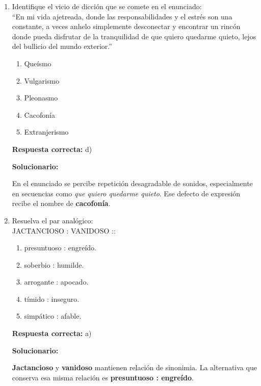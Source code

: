 \begin{enumerate}[resume]
	\vspace{2mm}
	\textbf{Solucionario:}
	
	En el contexto de la oración, \textbf{germen} significa inicio, principio o \textbf{origen}. Por ello, la respuesta correcta es \textbf{origen}.
	
	\vspace{6mm}
	
	\item Identifique el vicio de dicción que se comete en el enunciado:\\
	``En mi vida ajetreada, donde las responsabilidades y el estrés son una constante, a veces anhelo simplemente desconectar y encontrar un rincón donde pueda disfrutar de la tranquilidad de que quiero quedarme quieto, lejos del bullicio del mundo exterior.''
	\begin{enumerate}[label=\alph*)]
		\item Queísmo
		\item Vulgarismo
		\item Pleonasmo
		\item Cacofonía
		\item Extranjerismo
	\end{enumerate}
	\textbf{Respuesta correcta:} d)
	
	\vspace{2mm}
	\textbf{Solucionario:}
	
	En el enunciado se percibe repetición desagradable de sonidos, especialmente en secuencias como \textit{que quiero quedarme quieto}. Ese defecto de expresión recibe el nombre de \textbf{cacofonía}.
	
	\vspace{6mm}
	
	\item Resuelva el par analógico:\\
	JACTANCIOSO : VANIDOSO ::
	\begin{enumerate}[label=\alph*)]
		\item presuntuoso : engreído.
		\item soberbio : humilde.
		\item arrogante : apocado.
		\item tímido : inseguro.
		\item simpático : afable.
	\end{enumerate}
	\textbf{Respuesta correcta:} a)
	
	\vspace{2mm}
	\textbf{Solucionario:}
	
	\textbf{Jactancioso} y \textbf{vanidoso} mantienen relación de sinonimia. La alternativa que conserva esa misma relación es \textbf{presuntuoso : engreído}.
	

\end{enumerate}
